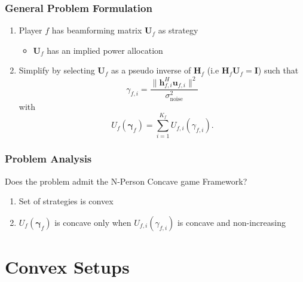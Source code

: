 \documentclass[10pt,tgadventor, onlymath]{beamer}
\begin{document}
\begin{frame}

\frametitle{General Problem Formulation}
\begin{enumerate}
\setlength\itemsep{2em}

\item  Player $f$ has beamforming matrix $\mathbf{U}_f$ as strategy
\begin{itemize}
\item $\mathbf{U}_f$ has an implied power allocation
\end{itemize}
\item Simplify by selecting $\mathbf{U}_f$ as a pseudo inverse of $\mathbf{H}_f$  (i.e $\mathbf{H}_f\mathbf{U}_f = \mathbf{I}$) such that 
	\begin{equation*}
	\gamma_{f,i} = \frac{\|\mathbf{h}^H_{f,i}\mathbf{u}_{f,i}\|^2}
	{\sigma^2_{\text{noise}}}
	\end{equation*}
	with 
	\begin{equation*}
	U_{f}(\boldsymbol{\gamma}_{f}) =
	\sum_{i=1}^{K_{f}}
    	 U_{f,i}(\gamma_{f,i}) .
	\end{equation*}
\end{enumerate}
\end{frame}



\begin{frame}
\frametitle{Problem Analysis}
Does the problem admit the N-Person Concave game Framework? 
\\
\begin{enumerate}
\setlength\itemsep{2em}
\item  Set of strategies is convex \faThumbsOUp
\pause
\item  $U_{f}(\boldsymbol{\gamma}_{f})$ is concave only when $U_{f,i}(\gamma_{f,i})$ is concave and non-increasing 
\faThumbsODown
\end{enumerate}
\end{frame}


\section{Convex Setups}
\end{document}
